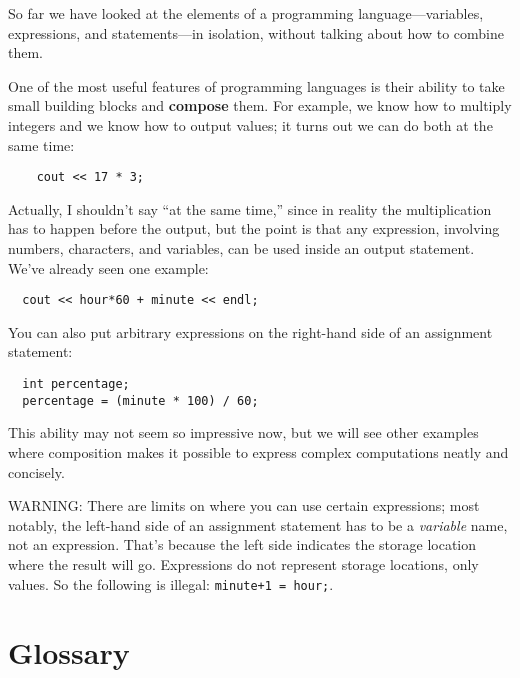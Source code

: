 So far we have looked at the elements of a programming
language---variables, expressions, and statements---in
isolation, without talking about how to combine them.

One of the most useful features of programming languages
is their ability to take small building blocks and
{\bf compose} them.  For example, we know how to multiply
integers and we know how to output values; it turns out we can
do both at the same time:

\begin{lstlisting}
    cout << 17 * 3;
\end{lstlisting}
%
Actually, I shouldn't say ``at the same time,'' since in reality
the multiplication has to happen before the output, but
the point is that any expression, involving numbers, characters,
and variables, can be used inside an output statement.  We've
already seen one example:

\begin{lstlisting}
  cout << hour*60 + minute << endl;
\end{lstlisting}
%
You can also put arbitrary expressions on the right-hand
side of an assignment statement:

\begin{lstlisting}
  int percentage;
  percentage = (minute * 100) / 60;
\end{lstlisting}
%
This ability may not seem so impressive now, but we will see
other examples where composition makes it possible
to express complex computations neatly and concisely.

WARNING: There are limits on where you can use certain
expressions; most notably, the left-hand side of an assignment
statement has to be a {\em variable} name, not an expression.
That's because the left side indicates the storage location
where the result will go.  Expressions
do not represent storage locations, only values.  So the
following is illegal:  {\tt minute+1 = hour;}.

\section{Glossary}

